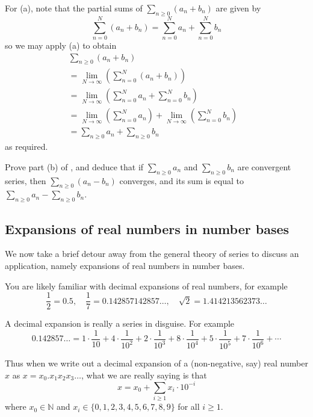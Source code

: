 \begin{cproof}[of {(a)}]
For (a), note that the partial sums of $\displaystyle \sum_{n \ge 0} (a_n+b_n)$ are given by
\[ \sum_{n=0}^N (a_n + b_n) = \sum_{n=0}^N a_n + \sum_{n=0}^N b_n \]
so we may apply (a) to obtain
\begin{align*}
& \sum_{n \ge 0} (a_n + b_n) && \\
&= \lim_{N \to \infty} \left( \sum_{n=0}^N (a_n + b_n) \right) && \\
&= \lim_{N \to \infty} \left( \sum_{n=0}^N a_n + \sum_{n=0}^N b_n \right) \\
&= \lim_{N \to \infty} \left( \sum_{n=0}^N a_n \right) + \lim_{N \to \infty} \left( \sum_{n=0}^N b_n \right) && \\
&= \sum_{n \ge 0} a_n + \sum_{n \ge 0} b_n
\end{align*}
as required.
\end{cproof}

\begin{exercise}
Prove part (b) of , and deduce that if $\displaystyle \sum_{n \ge 0} a_n$ and $\displaystyle \sum_{n \ge 0} b_n$ are convergent series, then $\displaystyle \sum_{n \ge 0} (a_n - b_n)$ converges, and its sum is equal to $\displaystyle \sum_{n \ge 0} a_n - \sum_{n \ge 0} b_n$.
\end{exercise}

\subsection*{Expansions of real numbers in number bases}

We now take a brief detour away from the general theory of series to discuss an application, namely expansions of real numbers in number bases.

You are likely familiar with decimal expansions of real numbers, for example
\[ \frac{1}{2} = 0.5, \quad \dfrac{1}{7} = 0.142857142857\dots{}, \quad \sqrt{2} = 1.414213562373\dots{} \]

A decimal expansion is really a series in disguise. For example
\[ 0.142857\dots{} = 1 \cdot \frac{1}{10} + 4 \cdot \frac{1}{10^2} + 2 \cdot \frac{1}{10^3} + 8 \cdot \frac{1}{10^4} + 5 \cdot \frac{1}{10^5} + 7 \cdot \frac{1}{10^6} + \cdots \]

Thus when we write out a decimal expansion of a (non-negative, say) real number $x$ as $x=x_0.x_1x_2x_3\dots{}$, what we are really saying is that
\[ x = x_0 + \sum_{i \ge 1} x_i \cdot 10^{-i} \]
where $x_0 \in \mathbb{N}$ and $x_i \in \{ 0,1,2,3,4,5,6,7,8,9 \}$ for all $i \ge 1$.

